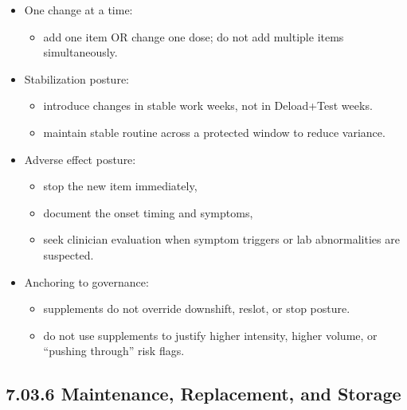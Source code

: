 \documentclass[10pt]{article}
\begin{document}
\begin{itemize}
\item One change at a time:
  \begin{itemize}
  \item add one item OR change one dose; do not add multiple items simultaneously.
  \end{itemize}
\item Stabilization posture:
  \begin{itemize}
  \item introduce changes in stable work weeks, not in Deload+Test weeks.
  \item maintain stable routine across a protected window to reduce variance.
  \end{itemize}
\item Adverse effect posture:
  \begin{itemize}
  \item stop the new item immediately,
  \item document the onset timing and symptoms,
  \item seek clinician evaluation when symptom triggers or lab abnormalities are suspected.
  \end{itemize}
\item Anchoring to governance:
  \begin{itemize}
  \item supplements do not override downshift, reslot, or stop posture.
  \item do not use supplements to justify higher intensity, higher volume, or “pushing through” risk flags.
  \end{itemize}
\end{itemize}

\subsection*{7.03.6 Maintenance, Replacement, and Storage}
{}
\end{document}
